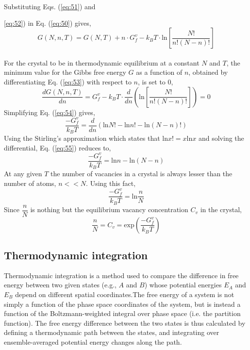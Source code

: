 \documentclass{article}
\begin{document}
Substituting Eqs. (\ref{eq:51}) and {\ref{eq:52}) in Eq. (\ref{eq:50}) gives,
%
\begin{equation} \label{eq:53}
G(N, n, T) = G(N, T) + n\cdot G^v_f  - k_BT \cdot \mathrm{ln} \left[\dfrac{N!}{n!(N-n)!}\right]
\end{equation}
%
\\
For the crystal to be in thermodynamic equilibrium at a constant $N$ and $T$, the minimum value for the Gibbs free energy $G$ as a function of $n$, obtained by differentiating Eq. (\ref{eq:53}) with respect to $n$, is set to 0,
%
\begin{equation} \label{eq:54}
\dfrac{dG(N, n, T)}{dn} = G^v_f  - k_BT \cdot \dfrac{d}{dn}\left(\mathrm{ln} \left[\dfrac{N!}{n!(N-n)!}\right]\right) = 0
\end{equation}
%
Simplifying Eq. (\ref{eq:54}) gives,
%
\begin{equation} \label{eq:55}
\dfrac{-G^v_f}{k_BT} = \dfrac{d}{dn}(\mathrm{ln}N! - \mathrm{ln}n! - \mathrm{ln}(N-n)!)
\end{equation}
%
Using the Stirling's approximation which states that $\mathrm{ln}x! = x\mathrm{ln}x$ and solving the differential, Eq. (\ref{eq:55}) reduces to,
%
\begin{equation} \label{eq:56}
\dfrac{-G^v_f}{k_BT} = \mathrm{ln}n - \mathrm{ln}(N-n)
\end{equation}
%
At any given $T$ the number of vacancies in a crystal is always lesser than the number of atoms, $n << N$. Using this fact,
%
\begin{equation} \label{eq:57}
\dfrac{-G^v_f}{k_BT} = \mathrm{ln}\dfrac{n}{N}
\end{equation}
%
Since $\dfrac{n}{N}$ is nothing but the equilibrium vacancy concentration $C_v$ in the crystal,
%
\begin{equation} \label{eq:58}
\dfrac{n}{N} = C_v = \mathrm{exp}\left(\dfrac{-G^v_f}{k_BT}\right)
\end{equation}
%

\subsection{Thermodynamic integration}\label{TI}

Thermodynamic integration is a method used to compare the difference in free energy between two given states (e.g., $A$ and $B$) whose potential energies $E_A$ and $E_B$ depend on different spatial coordinates.The free energy of a system is not simply a function of the phase space coordinates of the system, but is instead a function of the Boltzmann-weighted integral over phase space (i.e. the partition function). The free energy difference between the two states is thus calculated by defining a thermodynamic path between the states, and integrating over ensemble-averaged potential energy changes along the path.\\

}
\end{document}
